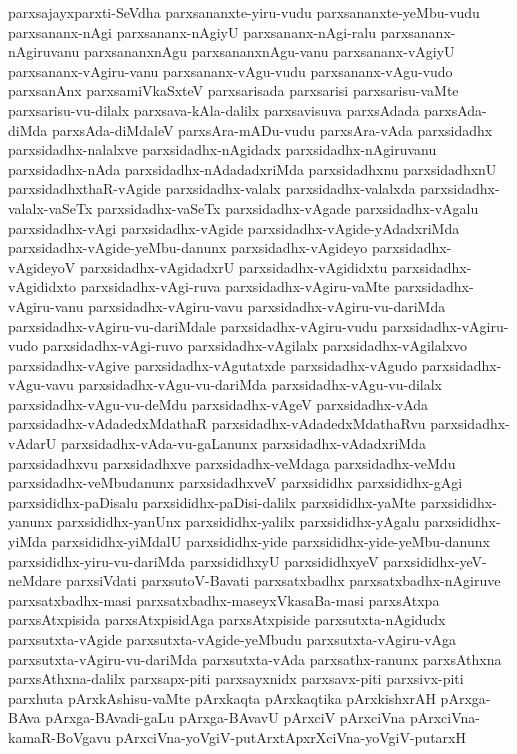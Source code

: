 {parxsajayxparxti-SeVdha
parxsananxte-yiru-vudu
parxsananxte-yeMbu-vudu
parxsananx-nAgi
parxsananx-nAgiyU
parxsananx-nAgi-ralu
parxsananx-nAgiruvanu
parxsananxnAgu
parxsananxnAgu-vanu
parxsananx-vAgiyU
parxsananx-vAgiru-vanu
parxsananx-vAgu-vudu
parxsananx-vAgu-vudo
parxsanAnx
parxsamiVkaSxteV
parxsarisada
parxsarisi
parxsarisu-vaMte
parxsarisu-vu-dilalx
parxsava-kAla-dalilx
parxsavisuva
parxsAdada
parxsAda-diMda
parxsAda-diMdaleV
parxsAra-mADu-vudu
parxsAra-vAda
parxsidadhx
parxsidadhx-nalalxve
parxsidadhx-nAgidadx
parxsidadhx-nAgiruvanu
parxsidadhx-nAda
parxsidadhx-nAdadadxriMda
parxsidadhxnu
parxsidadhxnU
parxsidadhxthaR-vAgide
parxsidadhx-valalx
parxsidadhx-valalxda
parxsidadhx-valalx-vaSeTx
parxsidadhx-vaSeTx
parxsidadhx-vAgade
parxsidadhx-vAgalu
parxsidadhx-vAgi
parxsidadhx-vAgide
parxsidadhx-vAgide-yAdadxriMda
parxsidadhx-vAgide-yeMbu-danunx
parxsidadhx-vAgideyo
parxsidadhx-vAgideyoV
parxsidadhx-vAgidadxrU
parxsidadhx-vAgididxtu
parxsidadhx-vAgididxto
parxsidadhx-vAgi-ruva
parxsidadhx-vAgiru-vaMte
parxsidadhx-vAgiru-vanu
parxsidadhx-vAgiru-vavu
parxsidadhx-vAgiru-vu-dariMda
parxsidadhx-vAgiru-vu-dariMdale
parxsidadhx-vAgiru-vudu
parxsidadhx-vAgiru-vudo
parxsidadhx-vAgi-ruvo
parxsidadhx-vAgilalx
parxsidadhx-vAgilalxvo
parxsidadhx-vAgive
parxsidadhx-vAgutatxde
parxsidadhx-vAgudo
parxsidadhx-vAgu-vavu
parxsidadhx-vAgu-vu-dariMda
parxsidadhx-vAgu-vu-dilalx
parxsidadhx-vAgu-vu-deMdu
parxsidadhx-vAgeV
parxsidadhx-vAda
parxsidadhx-vAdadedxMdathaR
parxsidadhx-vAdadedxMdathaRvu
parxsidadhx-vAdarU
parxsidadhx-vAda-vu-gaLanunx
parxsidadhx-vAdadxriMda
parxsidadhxvu
parxsidadhxve
parxsidadhx-veMdaga
parxsidadhx-veMdu
parxsidadhx-veMbudanunx
parxsidadhxveV
parxsididhx
parxsididhx-gAgi
parxsididhx-paDisalu
parxsididhx-paDisi-dalilx
parxsididhx-yaMte
parxsididhx-yanunx
parxsididhx-yanUnx
parxsididhx-yalilx
parxsididhx-yAgalu
parxsididhx-yiMda
parxsididhx-yiMdalU
parxsididhx-yide
parxsididhx-yide-yeMbu-danunx
parxsididhx-yiru-vu-dariMda
parxsididhxyU
parxsididhxyeV
parxsididhx-yeV-neMdare
parxsiVdati
parxsutoV-Bavati
parxsatxbadhx
parxsatxbadhx-nAgiruve
parxsatxbadhx-masi
parxsatxbadhx-maseyxVkasaBa-masi
parxsAtxpa
parxsAtxpisida
parxsAtxpisidAga
parxsAtxpiside
parxsutxta-nAgidudx
parxsutxta-vAgide
parxsutxta-vAgide-yeMbudu
parxsutxta-vAgiru-vAga
parxsutxta-vAgiru-vu-dariMda
parxsutxta-vAda
parxsathx-ranunx
parxsAthxna
parxsAthxna-dalilx
parxsapx-piti
parxsayxnidx
parxsavx-piti
parxsivx-piti
parxhuta
pArxkAshisu-vaMte
pArxkaqta
pArxkaqtika
pArxkishxrAH
pArxga-BAva
pArxga-BAvadi-gaLu
pArxga-BAvavU
pArxciV
pArxciVna
pArxciVna-kamaR-BoVgavu
pArxciVna-yoVgiV-putArxtApxrXciVna-yoVgiV-putarxH
}

